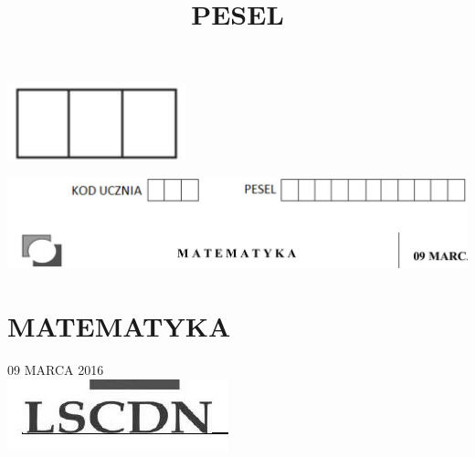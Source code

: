 \documentclass[10pt]{article}
\title{PESEL }
\author{}
\date{}
\begin{document}
\maketitle
\begin{center}
\includegraphics[max width=\textwidth]{2024_11_21_0213a2175f3206eefc55g-01(1)}
\end{center}

\begin{center}
\includegraphics[max width=\textwidth]{2024_11_21_0213a2175f3206eefc55g-01(2)}
\end{center}

\section*{MATEMATYKA}
09 MARCA 2016\\
\includegraphics[max width=\textwidth, center]{2024_11_21_0213a2175f3206eefc55g-01}
\end{document}
